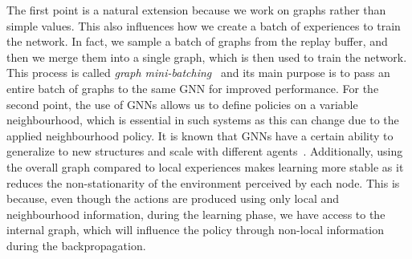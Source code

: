 The first point is a natural extension because we work on graphs rather than simple values.
This also influences how we create a batch of experiences to train the network.
 In fact, we sample a batch of graphs from the replay buffer,
 and then we merge them into a single graph,
 which is then used to train the network.
 This process is called \emph{graph mini-batching}~\cite{DBLP:journals/corr/abs-1903-02428,wang2019deep}
 and its main purpose is to pass an entire batch of graphs to the same \ac{GNN} for improved performance.
%
For the second point,
 the use of \acp{GNN} allows us to define policies on a variable neighbourhood, which is essential in such systems as this can change due to the applied neighbourhood policy.
 It is known that \acp{GNN} have a certain ability to generalize to new structures and scale with different agents~\cite{DBLP:journals/aiopen/ZhouCHZYLWLS20,DBLP:conf/nips/KnyazevTA19}. 
% 
Additionally, 
 using the overall graph compared to local experiences makes learning more stable as it reduces the non-stationarity of the environment perceived by each node.
% 
This is because, even though the actions are produced using only local and neighbourhood information, 
 during the learning phase, we have access to the internal graph, 
 which will influence the policy through non-local information 
 during the backpropagation.
%
